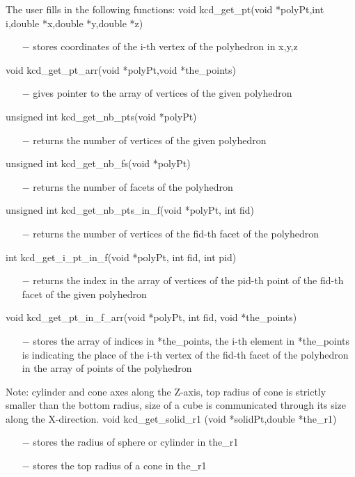 The user fills in the following functions:\newline
void kcd\_get\_pt(void *polyPt,int i,double *x,double *y,double *z)
\begin{itemize}
\item[$-$] stores coordinates of the i-th vertex of the polyhedron in x,y,z
\end{itemize}
void kcd\_get\_pt\_arr(void *polyPt,void *the\_points)
\begin{itemize}
\item[$-$] gives pointer to the array of vertices of the given polyhedron
\end{itemize}
unsigned int kcd\_get\_nb\_pts(void *polyPt)
\begin{itemize}
\item[$-$] returns the number of vertices of the given polyhedron
\end{itemize}
unsigned int kcd\_get\_nb\_fs(void *polyPt)
\begin{itemize}
\item[$-$] returns the number of facets of the polyhedron
\end{itemize}
unsigned int kcd\_get\_nb\_pts\_in\_f(void *polyPt, int fid)
\begin{itemize}
\item[$-$] returns the number of vertices of the fid-th facet of the polyhedron
\end{itemize}
int kcd\_get\_i\_pt\_in\_f(void *polyPt, int fid, int pid)
\begin{itemize}
\item[$-$] returns the index in the array of vertices 
      of the pid-th point of the fid-th facet of the given polyhedron
\end{itemize}
void kcd\_get\_pt\_in\_f\_arr(void *polyPt, int fid, void *the\_points)
\begin{itemize}
\item[$-$] stores the array of indices in *the\_points, the i-th element in  
      *the\_points is indicating the place of the i-th vertex of the
      fid-th facet of the polyhedron in the array of points of the 
      polyhedron
\end{itemize}
Note: cylinder and cone axes along the Z-axis, top radius of cone is strictly
smaller than the bottom radius, size of a cube is communicated through its
size along the X-direction.\newline
void kcd\_get\_solid\_r1 (void *solidPt,double *the\_r1)
\begin{itemize}
\item[$-$] stores the radius of sphere or cylinder in the\_r1
\item[$-$] stores the top radius of a cone in the\_r1 
\end{itemize}
